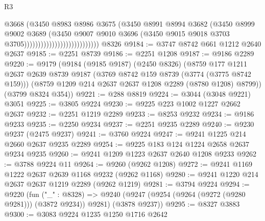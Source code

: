 \begin{lexlean}{R3}
\begin{coremodule}
                                                @3668
                                                (@3450
                                                  @8983
                                                  @8986
                                                  @3675
                                                  (@3450
                                                    @8991
                                                    @8994
                                                    @3682
                                                    (@3450
                                                      @8999
                                                      @9002
                                                      @3689
                                                      (@3450
                                                        @9007
                                                        @9010
                                                        @3696
                                                        (@3450
                                                          @9015
                                                          @9018
                                                          @3703
                                                          @3705)))))))))))))))))))))))))))
    @8326
@9184 := @3747 @8742 @661 @1212 @2640 @2637
@9185 := @2251 @8739
@9186 := @2251 @1208
@9187 := @9186 @2289
@9220 := @9179
    (@9184
      (@9185 @9187)
      (@2450 @8326)
      (@8759
        @177
        @1211
        @2637
        @2639
        @8739
        @9187
        (@3769 @8742 @159 @8739 (@3774 (@3775 @8742 @159)))
        (@8759 @1209 @214 @2637 @2637 @1208 @2289 (@8780 @1208) @8799))
      (@3799 @8324 @354))
@9221 := @288 @8819
@9224 := @3044 (@3048 @9221) @3051
@9225 := @3805 @9224
@9230 := @9225 @223 @1002 @1227 @2662 @2637
@9232 := @2251 @1219 @2289
@9233 := @8253 @9232
@9234 := @9186 @9233
@9235 := @2250 @9234
@9237 := @2251 @9235 @2289
@9240 := @9230 @9237 (@2475 @9237)
@9241 := @3760 @9224
@9247 := @9241 @1225 @214 @2660 @2637 @9235 @2289
@9254 := @9225 @183 @124 @1224 @2658 @2637 @9234 @9235
@9260 := @9241 @1209 @1223 @2637 @2640 @1208 @9233
@9262 := @3788 @9224 @11
@9264 := @9260 (@9262 @1208)
@9272 := @9241 @1169 @1222 @2637 @2639 @1168 @9232 (@9262 @1168)
@9280 := @9241 @1220 @214 @2637 @2637 @1219 @2289 (@9262 @1219)
@9281 := @3794 @9224
@9294 := @9220
    (fun ("_" : @8328) =>
    @9240 (@9247 (@9254 (@9264 (@9272 (@9280 @9281))) (@3872 @9234)) @9281) (@3878 @9237))
@9295 := @8327 @3883
@9300 := @3083 @9224 @1235 @1250 @1716 @2642

\end{coremodule}
\end{lexlean}
